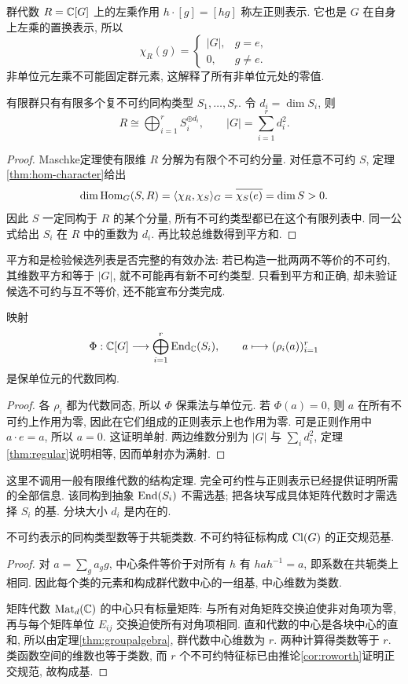 群代数 $R=\mathbb C[G]$ 上的左乘作用 $h\cdot[g]=[hg]$ 称左正则表示. 它也是 $G$ 在自身上左乘的置换表示, 所以
\[
 \chi_R(g)=\begin{cases}|G|,&g=e,\\0,&g\ne e.\end{cases}
\]
非单位元左乘不可能固定群元素, 这解释了所有非单位元处的零值.

\begin{theorem}\label{thm:regular}
有限群只有有限多个复不可约同构类型 $S_1,\ldots,S_r$. 令 $d_i=\dim S_i$, 则
\[
 R\cong\bigoplus_{i=1}^r S_i^{\oplus d_i},\qquad |G|=\sum_{i=1}^r d_i^2.
\]
\end{theorem}
\begin{proof}
Maschke定理使有限维 $R$ 分解为有限个不可约分量. 对任意不可约 $S$, 定理\ref{thm:hom-character}给出
\[
 \dim\operatorname{Hom}_G(S,R)=\langle \chi_R,\chi_S\rangle_G=\overline{\chi_S(e)}=\dim S>0.
\]
因此 $S$ 一定同构于 $R$ 的某个分量, 所有不可约类型都已在这个有限列表中. 同一公式给出 $S_i$ 在 $R$ 中的重数为 $d_i$. 再比较总维数得到平方和.
\end{proof}
平方和是检验候选列表是否完整的有效办法: 若已构造一批两两不等价的不可约, 其维数平方和等于 $|G|$, 就不可能再有新不可约类型. 只看到平方和正确, 却未验证候选不可约与互不等价, 还不能宣布分类完成.

\begin{theorem}\label{thm:groupalgebra}
映射
\[
 \Phi:\mathbb C[G]\longrightarrow\bigoplus_{i=1}^r\operatorname{End}_\mathbb C(S_i),\qquad
 a\longmapsto(\rho_i(a))_{i=1}^r
\]
是保单位元的代数同构.
\end{theorem}
\begin{proof}
各 $\rho_i$ 都为代数同态, 所以 $\Phi$ 保乘法与单位元. 若 $\Phi(a)=0$, 则 $a$ 在所有不可约上作用为零, 因此在它们组成的正则表示上也作用为零. 可是正则作用中 $a\cdot e=a$, 所以 $a=0$. 这证明单射. 两边维数分别为 $|G|$ 与 $\sum_i d_i^2$, 定理\ref{thm:regular}说明相等, 因而单射亦为满射.
\end{proof}
这里不调用一般有限维代数的结构定理. 完全可约性与正则表示已经提供证明所需的全部信息. 该同构到抽象 $\operatorname{End}(S_i)$ 不需选基; 把各块写成具体矩阵代数时才需选择 $S_i$ 的基. 分块大小 $d_i$ 是内在的.

\begin{theorem}\label{thm:classes}
不可约表示的同构类型数等于共轭类数. 不可约特征标构成 $\operatorname{Cl}(G)$ 的正交规范基.
\end{theorem}
\begin{proof}
对 $a=\sum_g a_g g$, 中心条件等价于对所有 $h$ 有 $hah^{-1}=a$, 即系数在共轭类上相同. 因此每个类的元素和构成群代数中心的一组基, 中心维数为类数.

矩阵代数 $\operatorname{Mat}_d(\mathbb C)$ 的中心只有标量矩阵: 与所有对角矩阵交换迫使非对角项为零, 再与每个矩阵单位 $E_{ij}$ 交换迫使所有对角项相同. 直和代数的中心是各块中心的直和, 所以由定理\ref{thm:groupalgebra}, 群代数中心维数为 $r$. 两种计算得类数等于 $r$. 类函数空间的维数也等于类数, 而 $r$ 个不可约特征标已由推论\ref{cor:roworth}证明正交规范, 故构成基.
\end{proof}

